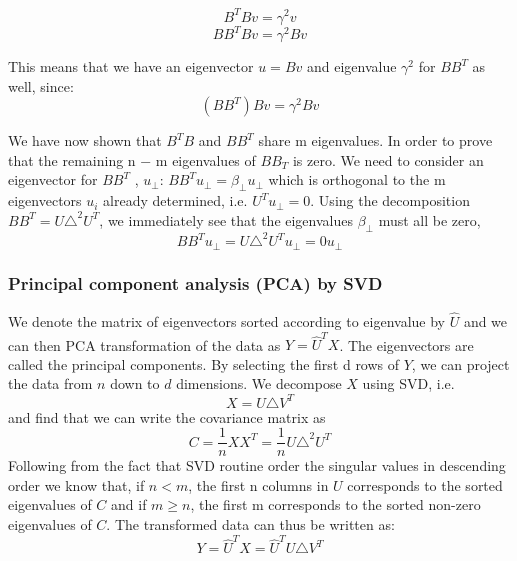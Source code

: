 \documentclass[12pt,twoside]{article}
\begin{document}
\begin{equation}
B^{T}Bv = \gamma^2v
\end{equation}
\begin{equation}
BB^{T}Bv = \gamma^2Bv
\end{equation}

\bigbreak
This means that we have an eigenvector $u = Bv$ and eigenvalue $\gamma^2$ for $BB^{T}$ as well, since:
\begin{equation}
(BB^{T})Bv = \gamma^2Bv
\end{equation}

\bigbreak
We have now shown that $B^{T}B$ and $BB^{T}$ share m eigenvalues.
\bigbreak
In order to prove that the remaining n − m eigenvalues of $BB_{T}$ is zero. We need to consider an eigenvector for  $BB^{T}$ , $u_{\perp}$: $BB^{T} u_{\perp} = \beta_{\perp} u_{\perp}$ which is orthogonal to the m eigenvectors $u_{i}$ already determined, i.e. $U^{T} u_{\perp} = 0$. Using the decomposition $BB^{T} = U\triangle^2U^{T}$, we immediately see that the eigenvalues $\beta_{\perp}$ must all be zero,
\begin{equation}
BB^{T} u_{\perp} = U\triangle^2U^{T} u_{\perp} = 0 u_{\perp}
\end{equation}
\bigbreak
\subsubsection{Principal component analysis (PCA) by SVD}
\bigbreak
We denote the matrix of eigenvectors sorted according to eigenvalue by $\hat{U}$ and we can then PCA transformation of the data as $Y = \hat{U}^{T}X$. The eigenvectors are called the principal components. By selecting the first d rows of $Y$, we can project the data from $n$ down to $d$ dimensions.
\bigbreak
We decompose $X$ using SVD, i.e.
\begin{equation}
X = U\triangle V^{T}
\end{equation}
\newline
and find that we can write the covariance matrix as
\begin{equation}
C = \frac{1}{n} XX^{T} = \frac{1}{n} U\triangle^2U^{T}
\end{equation}
\bigbreak
Following from the fact that SVD routine order the singular values in descending order we know that, if $n < m$, the first n columns in $U$ corresponds to the sorted eigenvalues of $C$ and if $m \geq n$, the first m corresponds to the sorted non-zero eigenvalues of $C$. The transformed data can thus be written as:
\begin{equation}
Y = \hat{U}^{T}X = \hat{U}^{T}U\triangle V^T
\end{equation}
\end{document}
